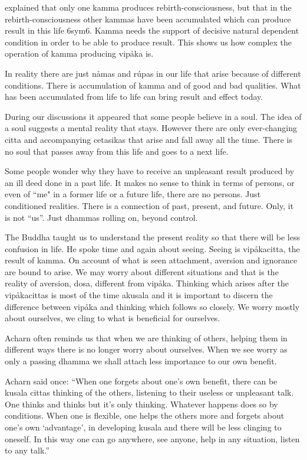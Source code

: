 \documentclass[10pt,a4paper,final]{article}
\begin{document}
\textportugueseAcharn explained that
only one kamma produces
rebirth-consciousness, but that in the rebirth-consciousness
other kammas have been
accumulated which can produce result in
this life
\protect\hyperlinksdfootnote6sym6.
Kamma needs the support of decisive natural dependent
condition in order to be able to produce result. This shows us how
complex the operation of kamma producing vipåka is. 

In reality there are
just nåmas and
rúpas in our life that arise
because of different conditions. There is
accumulation of kamma and of
good and bad qualities. What has been accumulated from life to life can
bring result and effect today. 

During our discussions
it appeared that some people believe in a soul. The idea of a soul
suggests a mental reality that stays. However there are only
ever-changing citta and accompanying cetasikas that arise and fall away
all the time. There is no soul that passes away from this life and goes
to a next life.

Some people wonder why they have to receive
an unpleasant result produced by an ill deed done in a past life.
It makes no sense to think in terms of
persons, or even of ``me" in a former
life or a future life, there are no persons. Just conditioned
realities. There is
a connection of past,
present, and future. Only,
it is not ``us''. Just
dhammas rolling on, beyond
control.

The Buddha taught us to understand the
present reality so that there will be less confusion in life. He spoke
time and again about seeing. Seeing is vipåkacitta, the result of kamma.
On account of what is seen attachment, aversion and ignorance are bound
to arise. We may worry about different situations and that is the
reality of aversion, dosa, different from vipåka. Thinking which arises
after the vipåkacittas is most of the time akusala and it is important
to discern the difference between vipåka and thinking which follows so
closely. We worry mostly about ourselves, we cling to what is beneficial
for ourselves. 

Acharn often reminds us that when we are
thinking of others, helping them in different ways there is no longer
worry about ourselves. When we see worry as only a passing dhamma we
shall attach less importance to our own benefit. 

Acharn said once:
``When one forgets about one's own
benefit, there can be kusala cittas thinking of the others, listening to
their useless or unpleasant talk. One thinks and thinks but it's only
thinking. Whatever happens does so by conditions. When one is flexible,
one helps the others more and forgets about one's own
`advantage',
in developing kusala and
there will be less clinging
to oneself. In this way one
can go anywhere, see anyone, help in any situation, listen to any
talk.''
\end{document}
